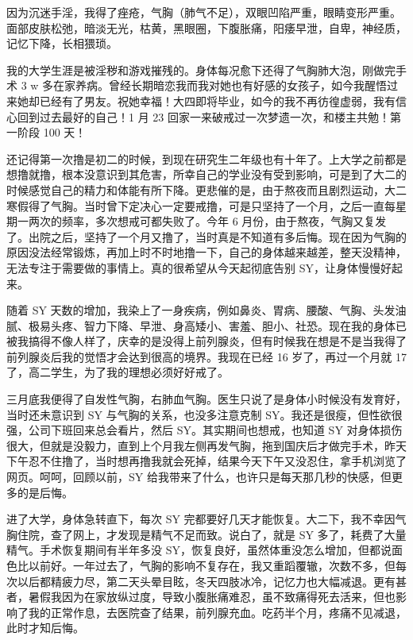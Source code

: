 \begin{case}[气胸]
    因为沉迷手淫，我得了痤疮，气胸（肺气不足），双眼凹陷严重，眼睛变形严重。面部皮肤松弛，暗淡无光，枯黄，黑眼圈，下腹胀痛，阳痿早泄，自卑，神经质，记忆下降，长相猥琐。
\end{case}

\begin{case}[气胸]
    我的大学生涯是被淫秽和游戏摧残的。身体每况愈下还得了气胸肺大泡，刚做完手术 3 w 多在家养病。曾经长期暗恋我而我对她也有好感的女孩子，如今我醒悟过来她却已经有了男友。祝她幸福！大四即将毕业，如今的我不再彷徨虚弱，我有信心回到过去最好的自己！1 月 23 回家一来破戒过一次梦遗一次，和楼主共勉！第一阶段 100 天！
\end{case}

\begin{case}[气胸]
    还记得第一次撸是初二的时候，到现在研究生二年级也有十年了。上大学之前都是想撸就撸，根本没意识到其危害，所幸自己的学业没有受到影响，可是到了大二的时候感觉自己的精力和体能有所下降。更悲催的是，由于熬夜而且剧烈运动，大二寒假得了气胸。当时曾下定决心一定要戒撸，可是只坚持了一个月，之后一直每星期一两次的频率，多次想戒可都失败了。今年 6 月份，由于熬夜，气胸又复发了。出院之后，坚持了一个月又撸了，当时真是不知道有多后悔。现在因为气胸的原因没法经常锻炼，再加上时不时地撸一下，自己的身体越来越差，整天没精神，无法专注于需要做的事情上。真的很希望从今天起彻底告别 SY，让身体慢慢好起来。
\end{case}

\begin{case}[气胸]
    随着 SY 天数的增加，我染上了一身疾病，例如鼻炎、胃病、腰酸、气胸、头发油腻、极易头疼、智力下降、早泄、身高矮小、害羞、胆小、社恐。现在我的身体已被我搞得不像人样了，庆幸的是没得上前列腺炎，但有时候我在想是不是当我得了前列腺炎后我的觉悟才会达到很高的境界。我现在已经 16 岁了，再过一个月就 17 了，高二学生，为了我的理想必须好好戒了。
\end{case}

\begin{case}[气胸]
    三月底我便得了自发性气胸，右肺血气胸。医生只说了是身体小时候没有发育好，当时还未意识到 SY 与气胸的关系，也没多注意克制 SY。我还是很瘦，但性欲很强，公司下班回来总会看片，然后 SY。其实期间也想戒，也知道 SY 对身体损伤很大，但就是没毅力，直到上个月我左侧再发气胸，拖到国庆后才做完手术，昨天下午忍不住撸了，当时想再撸我就会死掉，结果今天下午又没忍住，拿手机浏览了网页。呵呵，回顾以前，SY 给我带来了什么，也许只是每天那几秒的快感，但更多的是后悔。
\end{case}

\begin{case}[气胸]
    进了大学，身体急转直下，每次 SY 完都要好几天才能恢复。大二下，我不幸因气胸住院，查了网上，才发现是精气不足而致。说白了，就是 SY 多了，耗费了大量精气。手术恢复期间有半年多没 SY，恢复良好，虽然体重没怎么增加，但都说面色比以前好。一年过去了，气胸的影响不复存在，我又重蹈覆辙，次数不多，但每次以后都精疲力尽，第二天头晕目眩，冬天四肢冰冷，记忆力也大幅减退。更有甚者，暑假我因为在家放纵过度，导致小腹胀痛难忍，虽不致痛得死去活来，但也影响了我的正常作息，去医院查了结果，前列腺充血。吃药半个月，疼痛不见减退，此时才知后悔。
\end{case}

